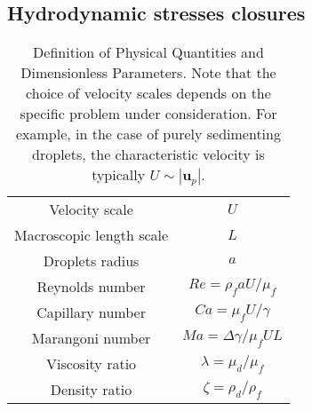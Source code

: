 \subsection{Hydrodynamic stresses closures}
\begin{table}
    \centering
\begin{tabular}{|c|c|}\hline
    Velocity scale & $U$ \\
    Macroscopic length scale & $L$ \\
    Droplets radius & $a$ \\
    Reynolds number & $Re = \rho_f a U / \mu_f$   \\
    Capillary number & $Ca = \mu_f U / \gamma$ \\
    Marangoni number & $Ma =  \Delta\gamma / \mu_f U L$ \\\hline
Viscosity ratio & $\lambda = \mu_d / \mu_f$ \\
Density ratio & $\zeta = \rho_d / \rho_f$ \\
\hline
    \end{tabular}
    \caption{Definition of Physical Quantities and Dimensionless Parameters.
    Note that the choice of velocity scales depends on the specific problem under consideration. 
    For example, in the case of purely sedimenting droplets, the characteristic velocity is typically $U \sim |\textbf{u}_p|$.}
\end{table}

